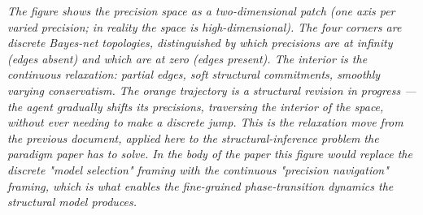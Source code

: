 \documentclass[11pt]{article}
\begin{document}
\begin{center}
\end{center}

\bigskip
\bigskip

\noindent\textit{\textcolor{notegrey}{The figure shows the precision space as a two-dimensional patch (one axis per varied precision; in reality the space is high-dimensional). The four corners are discrete Bayes-net topologies, distinguished by which precisions are at infinity (edges absent) and which are at zero (edges present). The interior is the continuous relaxation: partial edges, soft structural commitments, smoothly varying conservatism. The orange trajectory is a structural revision in progress — the agent gradually shifts its precisions, traversing the interior of the space, without ever needing to make a discrete jump. This is the relaxation move from the previous document, applied here to the structural-inference problem the paradigm paper has to solve. In the body of the paper this figure would replace the discrete "model selection" framing with the continuous "precision navigation" framing, which is what enables the fine-grained phase-transition dynamics the structural model produces.}}
\end{document}
